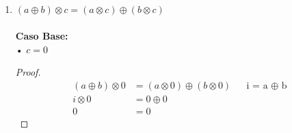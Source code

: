 \documentclass[11pt,letterpaper]{article}
\begin{document}
\begin{enumerate}
\vspace{0.1cm}

\noindent \textbf{\large Caso Inductivo:}\\
\noindent • $c=\sigma(c)$ \\
\noindent • \textbf{Hipótesis Inductiva: } $a \otimes (b \otimes c)=(a\otimes b)\otimes c$ \\
\noindent • \emph{Demostrar que:} $a \otimes (b \otimes \sigma(c))=(a \otimes b)\otimes \sigma(c)$

\begin{proof}
\begin{align}
a \otimes (b \otimes \sigma(c))&=(a \otimes b)\otimes \sigma(c) && \text{Definición de la multiplicación.} \\
a \otimes (b \otimes \sigma(c))&=((a \otimes b)\otimes c) \oplus (a \otimes b) && \text{Por hipotesis inductiva.} \\
a \otimes (b \otimes \sigma(c))&= (a \otimes (b \otimes c)) \oplus (a \otimes b) && \text{La suma es conmutativa.} \\
a \otimes (b \otimes \sigma(c))&= (a \otimes b) \oplus (a \otimes (b \otimes c)) && \text{La suma es distributiva.} \\
a \otimes (b \otimes \sigma(c))&= a \otimes (b \oplus (b \otimes c)) && \text{La suma es conmutativa.} \\
a \otimes (b \otimes \sigma(c))&= a \otimes ((b \otimes c) \oplus b) && \text{Definición de la multiplicación.}\\
a \otimes (b \otimes \sigma(c))&= a \otimes (b \otimes \sigma(c))
\end{align}
\end{proof}


\item{$(a\oplus b)\otimes c = (a\otimes c) \oplus (b \otimes c)$} \\
\\
\noindent \textbf{\large Caso Base:}\\
\noindent • $c=0$
\begin{proof}
\begin{align*}
(a \oplus b) \otimes 0 &= (a \otimes 0) \oplus (b \otimes 0) && \text{i\ =\ a\ $\oplus$\ b} \\
i \otimes 0 &= 0 \oplus 0 \\
0 &= 0
\end{align*}
\end{proof}


\end{enumerate}
\end{document}
